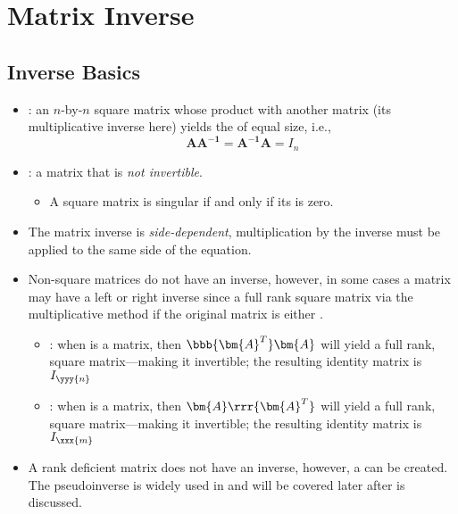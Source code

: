 \chapter{Matrix Inverse}\label{Matrix Inverse}
\section{Inverse Basics}\label{Inverse Basics}
\begin{itemize}
  \item {}: an \(n\)-by-\(n\) square \hyperref[Matrix Rank]{} matrix whose product with another matrix (its multiplicative inverse here) yields the \hyperref[Identity and Zero Matrices]{} of equal size, i.e.,
  \[%
  \bm{AA ^{-1}} = \bm{A ^{-1}A} = I_n
  \]%
  \item {}: a matrix that is \emph{not invertible}.
    \begin{itemize}
      \item A square matrix is singular if and only if its \hyperref[The Determinant]{} is zero.
    \end{itemize}
  \item The matrix inverse is \emph{side-dependent}, multiplication by the inverse must be applied to the same side of the equation.
  \item Non-square matrices do not have an inverse, however, in some cases a matrix may have a left or right inverse since a full rank square matrix \hyperref[Hadamard Multiplication]{} via the multiplicative method if the original matrix is either \hyperref[Matrix Rank]{}.
    \begin{itemize}
      \item {}: when  is a  matrix, then \(\bbb{\bm{A}^T}\bm{A}\) will yield a full rank, square matrix---making it invertible; the resulting identity matrix is \(I_{\yyy{n}}\)
      \item {}: when  is a  matrix, then \(\bm{A}\rrr{\bm{A}^T}\) will yield a full rank, square matrix---making it invertible; the resulting identity matrix is \(I_{\xxx{m}}\)
    \end{itemize}
  \item A rank deficient matrix does not have an inverse, however, a \hyperref[Singular Value Decomposition]{} can be created. The pseudoinverse is widely used in and will be covered later after \hyperref[Singular Value Decomposition]{} is discussed.

\end{itemize}
